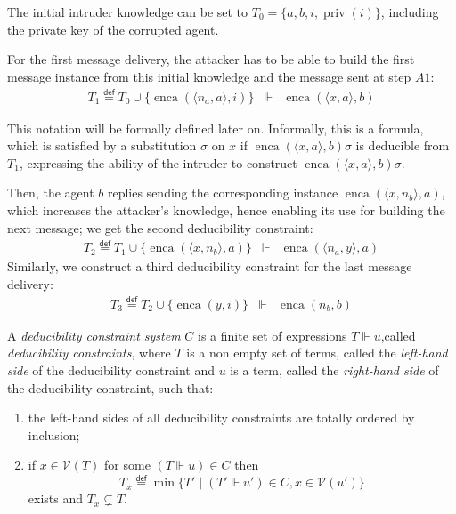 \documentclass[acmtocl,acmnow]{acmtrans2m}
\newcommand{\var}{\mathcal{V}}
\newcommand{\set}[1]{\lbrace{#1}\rbrace}
\newcommand{\pair}[2]{\langle{#1},{#2}\rangle}
\newcommand{\enca}{\operatorname{enca}}
\newcommand{\pub}[1]{#1}
\newcommand{\priv}{\operatorname{priv}}
\newcommand{\eqdef}{\stackrel{\mathsf{def}}{=}}
\newcommand{\dedcons}[1]{deducibility constraint}
\newcommand{\dedsys}[1]{deducibility constraint system}
\newcommand{\dedconss}[1]{deducibility constraints}
\begin{document}
\begin{example}
The initial intruder knowledge can be set to
$T_0 = \{a,b,i,\priv(i)\}$, including the private
key of the corrupted agent.

For the first message delivery, the attacker has to be able to build
the first message instance from this initial knowledge and the message
sent at step $A1$:
\begin{eqnarray}
T_1\eqdef T_0\cup\{\enca(\pair{n_a}{a},\pub{i})\} & \Vdash &
\enca(\pair{x}{a},\pub{b})\label{eq1}
\end{eqnarray}

This notation will be formally defined later on. Informally, this is
a formula, which is satisfied by a substitution $\sigma$ on $x$ if
$\enca(\pair{x}{a},\pub{b})\sigma$ is deducible from $T_1$, expressing
the ability of the intruder to construct $\enca(\pair{x}{a},\pub{b})\sigma$.

Then, the agent $b$ replies sending the corresponding instance 
$\enca(\pair{x}{n_b},\pub{a})$, which increases the attacker's knowledge,
hence enabling its use for building the next message; we get the second
\dedcons{}:
\begin{eqnarray}
T_2\eqdef T_1\cup\{\enca(\pair{x}{n_b},\pub{a})\} & \Vdash &
\enca(\pair{n_a}{y},\pub{a})\label{eq2}
\end{eqnarray}
Similarly, we construct a third \dedcons{} for the last message delivery:
\begin{eqnarray}
T_3\eqdef T_2\cup\{\enca(y,\pub{i})\} & \Vdash &
\enca(n_b,\pub{b})
\end{eqnarray}



\end{example}

\begin{definition}\label{def:constraint_sys}
A \emph{\dedsys{}} $C$ is a finite set of expressions
$T\Vdash u$,\linebreak called \emph{\dedconss{}}, where $T$ is a non empty set of terms, called the \emph{left-hand
side} of the \dedcons{} and
$u$ is a term, called the \emph{right-hand side} of the \dedcons{}, such that:
\begin{enumerate}
\item\label{def-item:cs1} the left-hand sides of all \dedconss{} are totally ordered by inclusion;
\item\label{def-item:cs2} if $x\in\var(T)$ for some $(T\Vdash u)\in C$ then \[T_x\eqdef\min\set{T'\mid (T'\Vdash u') \in C,
x\in\var(u')}\] exists and $T_x\subsetneq T$.
\end{enumerate}
\end{definition}
\end{document}
